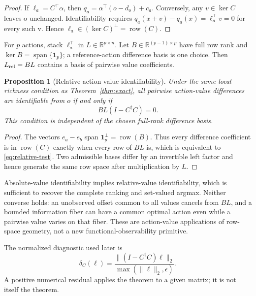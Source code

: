 \documentclass[10pt,twocolumn,twoside]{IEEEtran}
\newtheorem{proposition}{Proposition}
\DeclareMathOperator{\row}{row}
\begin{document}
\begin{proof}
If \(\ell_a=C^\top\alpha\), then
\(q_a=\alpha^\top(o-d_o)+c_a\).  Conversely, any \(v\in\ker C\) leaves o
unchanged.  Identifiability requires
\(q_a(x+v)-q_a(x)=\ell_a^\top v=0\) for every such v.  Hence
\(\ell_a\in(\ker C)^\perp=\row(C)\).
\end{proof}

For \(p\) actions, stack \(\ell_a^\top\) in
\(L\in\mathbb R^{p\times n}\).  Let \(B\in\mathbb R^{(p-1)\times p}\)
have full row rank and
\(\ker B=\operatorname{span}\{\mathbf 1_p\}\); a reference-action difference
basis is one choice.  Then \(L_{\rm rel}=BL\) contains a basis of pairwise
value coefficients.

\begin{proposition}[Relative action-value identifiability]
\label{prop:relative}
Under the same local-richness condition as Theorem~\ref{thm:exact}, all
pairwise action-value differences are identifiable from \(o\) if and only if
\begin{equation}
BL(I-C^\dagger C)=0.
\label{eq:relative-test}
\end{equation}
This condition is independent of the chosen full-rank difference basis.
\end{proposition}

\begin{proof}
The vectors \(e_a-e_b\) span
\(\mathbf 1_p^\perp=\row(B)\).  Thus every difference coefficient is in
\(\row(C)\) exactly when every row of \(BL\) is, which is equivalent to
\eqref{eq:relative-test}.  Two admissible bases differ by an invertible left
factor and hence generate the same row space after multiplication by \(L\).
\end{proof}

Absolute-value identifiability implies relative-value identifiability, which
is sufficient to recover the complete ranking and set-valued argmax.  Neither
converse holds: an unobserved offset common to all values cancels from \(BL\),
and a bounded information fiber can have a common optimal action even while a
pairwise value varies on that fiber.  These are action-value applications of
row-space geometry, not a new functional-observability primitive.

The normalized diagnostic used later is
\begin{equation}
\delta_C(\ell)=
\frac{\|(I-C^\dagger C)\ell\|_2}{\max(\|\ell\|_2,\epsilon)}.
\label{eq:residual}
\end{equation}
A positive numerical residual applies the theorem to a given matrix; it is
not itself the theorem.
\end{document}
